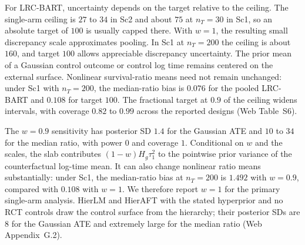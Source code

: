 \documentclass[11pt]{article}
\theoremstyle{definition}
\theoremstyle{plain}
\begin{document}
For LRC-BART, uncertainty depends on the target relative to the ceiling. The single-arm ceiling is $27$ to $34$ in Sc2 and about $75$ at $n_T=30$ in Sc1, so an absolute target of $100$ is usually capped there. With $w=1$, the resulting small discrepancy scale approximates pooling. In Sc1 at $n_T=200$ the ceiling is about $160$, and target $100$ allows appreciable discrepancy uncertainty. The prior mean of a Gaussian control outcome or control log time remains centered on the external surface. Nonlinear survival-ratio means need not remain unchanged: under Sc1 with $n_T=200$, the median-ratio bias is $0.076$ for the pooled LRC-BART and $0.108$ for target $100$. The fractional target at $0.9$ of the ceiling widens intervals, with coverage $0.82$ to $0.99$ across the reported designs (Web Table~S6).

The $w=0.9$ sensitivity has posterior SD $1.4$ for the Gaussian ATE and $10$ to $34$ for the median ratio, with power $0$ and coverage $1$. Conditional on $w$ and the scales, the slab contributes $(1-w)H_g\tau_1^2$ to the pointwise prior variance of the counterfactual log-time mean. It can also change nonlinear ratio means substantially: under Sc1, the median-ratio bias at $n_T=200$ is $1.492$ with $w=0.9$, compared with $0.108$ with $w=1$. We therefore report $w=1$ for the primary single-arm analysis. HierLM and HierAFT with the stated hyperprior and no RCT controls draw the control surface from the hierarchy; their posterior SDs are $8$ for the Gaussian ATE and extremely large for the median ratio (Web Appendix~G.2).
\end{document}

